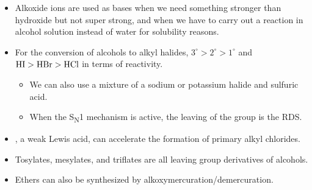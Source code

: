 \documentclass[../notes.tex]{subfiles}
\begin{document}
\begin{itemize}
    \item Alkoxide ions are used as bases when we need something stronger than hydroxide but not super strong, and when we have to carry out a reaction in alcohol solution instead of water for solubility reasons.
    \item For the conversion of alcohols to alkyl halides, $3^\circ>2^\circ>1^\circ$ and $\ce{HI}>\ce{HBr}>\ce{HCl}$ in terms of reactivity.
    \begin{itemize}
        \item We can also use a mixture of a sodium or potassium halide and sulfuric acid.
        \item When the S\textsubscript{N}1 mechanism is active, the leaving of the  group is the RDS.
    \end{itemize}
    \item {}, a weak Lewis acid, can accelerate the formation of primary alkyl chlorides.
    \item Tosylates, mesylates, and triflates are all leaving group derivatives of alcohols.
    \item Ethers can also be synthesized by alkoxymercuration/demercuration.
\end{itemize}
\end{document}
